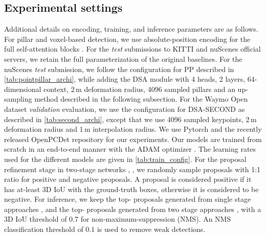\documentclass[10pt,twocolumn,letterpaper]{article}
\begin{document}
\subsection{Experimental settings}
Additional details on encoding, training, and inference parameters are as follows. For pillar and voxel-based detection, we use absolute-position encoding for the full self-attention blocks \cite{SA}. For the \textit{test} submissions to KITTI and nuScenes official servers, we retain the full parameterization of the original baselines. For the nuScenes \textit{test} submission, we follow the configuration for PP described in \cref{tab:pointpillar_archi}, while adding the DSA module with 4 heads, 2 layers, 64-dimensional context, 2\,m deformation radius, 4096 sampled pillars and an up-sampling method described in the following subsection. For the Waymo Open dataset \textit{validation} evaluation, we use the configuration for DSA-SECOND as described in \cref{tab:second_archi}, except that we use 4096 sampled keypoints, 2\,m deformation radius and 1\,m interpolation radius. We use Pytorch \cite{Pytorch} and the recently released OpenPCDet \cite{OpenPCDet} repository for our experiments. Our models are trained from scratch in an end-to-end manner with the ADAM optimizer \cite{Adam}. The learning rates used for the different models are given in \cref{tab:train_config}. For the proposal refinement stage in two-stage networks \cite{PointRCNN}, \cite{PVRCNN}, we randomly sample  proposals with 1:1 ratio for positive and negative proposals. A proposal is considered positive if it has at-least  3D IoU with the ground-truth boxes, otherwise it is considered to be negative. For inference, we keep the top- proposals generated from  single stage approaches \cite{pointpillars}, \cite{SECOND} and the top- proposals generated from two stage approaches \cite{PointRCNN}, \cite{PVRCNN} with a 3D IoU threshold of 0.7 for non-maximum-suppression (NMS). An NMS classification threshold of 0.1 is used to remove weak detections.
\end{document}
